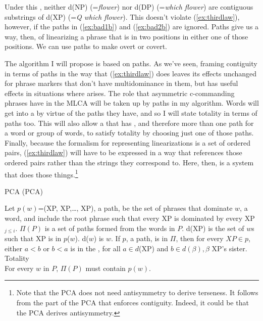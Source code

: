\documentclass[output=paper]{langsci/langscibook}
\begin{document}
Under this , neither d(NP) (=\emph{flower}) nor d(DP) (=\emph{which flower}) are contiguous substrings of d(XP) (=\emph{Q which flower}). This  doesn't violate (\ref{ex:thirdlaw}), however, if the paths in (\ref{ex:bad1b}) and (\ref{ex:bad2b}) are ignored. Paths give us a way, then, of linearizing a phrase that is in two positions in either one of those positions. We can use paths to make  overt or covert.

The  algorithm I will propose is based on paths. As we've seen,
framing contiguity in terms of paths in the way that (\ref{ex:thirdlaw}) does
leaves its effects unchanged for phrase markers that don't have multidominance
in them, but has useful effects in situations where  arises. The
role that asymmetric c-commanding phrases have in the \gls{MLCA} will be taken
up by paths in my algorithm. Words will get into a  by virtue of
the paths they have, and so I will state totality in terms of paths too. This
will also allow a  that has , and therefore more
than one path for a word or group of words, to satisfy totality by choosing
just one of those paths. Finally, because the formalism for representing
linearizations is a set of ordered pairs, (\ref{ex:thirdlaw}) will have to be
expressed in a way that references those ordered pairs rather than the strings
they correspond to. Here, then, is a system that does those
things.\footnote{Note that the \gls{PCA} does not need antisymmetry to
derive terseness. It follows from the part of the \gls{PCA} that enforces
contiguity. Indeed, it could be that the \gls{PCA} derives antisymmetry.}
\begin{exe}
    \ex \label{ex:pca} \glsdesc{PCA} (\gls{PCA})
	\begin{xlist}
		\ex Let $p(w)$=(XP, XP,\ldots, XP), a path, be the set of phrases that dominate $w$, a word, and include the root phrase such that every XP is dominated by every XP$_{j \leq i}$.
		\ex $\Pi(P)$ is a set of paths formed from the words in $P.$
		\ex d(XP) is the set of $w$s such that XP is in $p$($w$). d($w$) is $w$.
		\ex \label{ex:engine} If $p$, a path, is in $\Pi$, then for every $XP \in p$, either $a<b$ or $b<a$ is in the , for all $a \in d$(XP) and $b \in d(\beta), \beta$ XP's sister.
		\ex Totality\\
		For every $w$ in $P$, $\Pi(P)$ must contain $p(w)$.
	\end{xlist}
\end{exe}
\end{document}
